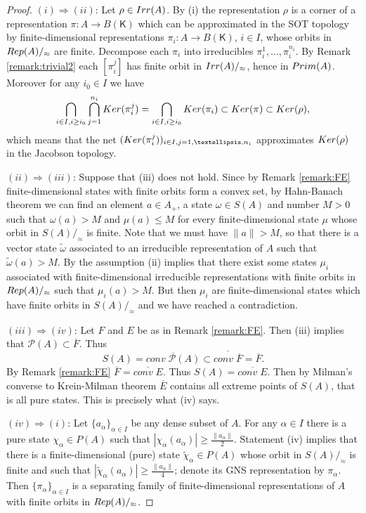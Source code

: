 \documentclass[11 pt, leqno, hidelinks]{amsart}%
\theoremstyle{plain}
\numberwithin{equation}{section}
\newcommand{\Rep}{\textup{Rep}}
\newcommand{\Irr}{\textup{Irr}}
\newcommand{\Prim}{\textup{Prim}}
\newcommand{\Ker}{\textup{Ker}}
\newcommand{\Kil}{\mathsf{K}}
\begin{document}
\begin{proof}
	$(i)\Longrightarrow(ii)$:
	Let $\rho \in \Irr(A)$. By (i) the representation $\rho$ is a corner of a representation $\pi:A \to B(\Kil)$ which can be approximated in the SOT topology by finite-dimensional representations $\pi_i:A \to B(\Kil)$, $i \in I$, whose orbits in $\Rep(A)/_\approx$ are finite. Decompose each $\pi_i$ into irreducibles $\pi_i^1, \ldots, \pi_i^{n_i}$. By Remark \ref{remark:trivial2} each $[\pi_i^j]$ has finite orbit in $\Irr(A)/_\approx$, hence in $\Prim(A)$. Moreover for any $i_0 \in I$  we have
	\[ \bigcap_{i \in I, i \geq i_0} \bigcap_{j=1}^{n_i} \Ker (\pi_i^j) = \bigcap_{i \in I, i \geq i_0}  \Ker (\pi_i) \subset \Ker(\pi) \subset \Ker (\rho),\]
	which means that the net $(\Ker(\pi_i^j))_{i \in I, j=1, \ldots, n_i}$ approximates $\Ker(\rho)$ in the Jacobson topology.
	
	\medskip


	$(ii)\Longrightarrow (iii)$:
	Suppose that (iii) does not hold. Since by Remark \ref{remark:FE} finite-dimensional states with finite orbits form  a convex set, by Hahn-Banach theorem we can find an element $a \in A_+$, a state $\omega \in S(A)$ and number $M>0$ such that $\omega(a)>M$ and $\mu(a) \leqslant M$ for every finite-dimensional  state $\mu$ whose orbit in $S(A)/_\approx$ is finite.  Note that we must have $\|a\|> M$, so that there is a vector state $\tilde{\omega}$ associated to an irreducible representation of $A$ such that $\tilde{\omega}(a)>M$. By
	\cite[Theorem 1.4]{Fell} the assumption (ii) implies that there exist some states $\mu_i$ associated with finite-dimensional irreducible representations with finite orbits in $\Rep(A)/_\approx$ such that $\mu_i(a)>M$. But then $\mu_i$ are finite-dimensional states which  have finite orbits in $S(A)/_\approx$ and we have reached a contradiction.
	
		\medskip


$(iii)\Longrightarrow(iv) $:
Let $F$ and $E$ be as in Remark \ref{remark:FE}. Then (iii) implies that $\mathcal P(A) \subset \overline F$. Thus $$S(A) = \overline{conv \; \mathcal P(A)} \subset \overline{conv \; \overline F} = \overline F.$$  By Remark  \ref{remark:FE} $\overline F = \overline {conv \; E}$. Thus  $S(A) =  \overline {conv \; E}$.  Then by Milman's converse to Krein-Milman theorem
$\overline E$ contains all  extreme points of $S(A)$, that is all pure states. This is precisely what (iv) says.
	
\medskip


$(iv)\Longrightarrow(i) $: Let $\{a_{\alpha}\}_{\alpha\in I}$ be any dense subset of $A$. For any $\alpha\in I$ there is a pure state $\chi_{\alpha}\in P(A)$ such that $|\chi_{\alpha}(a_{\alpha})| \ge  \frac{\|a_{\alpha}\|}{2}$. Statement (iv) implies that there is a  finite-dimensional (pure) state $\tilde \chi_{\alpha} \in P(A)$  whose orbit in $S(A)/_\approx$ is finite and such that $|\tilde \chi_{\alpha}(a_{\alpha})|\ge \frac{\|a_{\alpha}\|}{4}$; denote its GNS representation by $\pi_{\alpha}$. Then  $\{\pi_{\alpha}\}_{\alpha\in I}$ is a separating family of finite-dimensional representations of $A$ with finite orbits in $\Rep(A)/_\approx$.


\end{proof}
\end{document}
